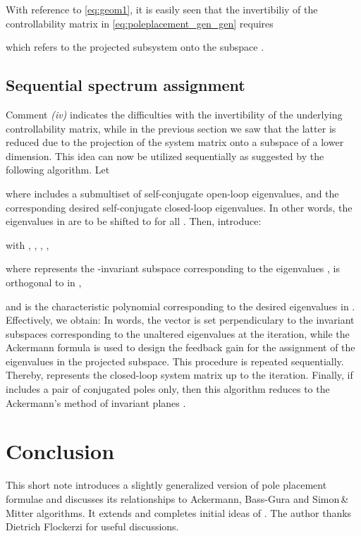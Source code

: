 \documentclass[conference]{IEEEtran}
\begin{document}
With reference to \eqref{eq:geom1},  it is easily seen that the invertibiliy of the controllability matrix  in \eqref{eq:poleplacement_gen_gen} requires

which refers to the projected subsystem  onto the subspace  \cite{Saad86}.

\subsection{Sequential spectrum assignment}
\label{Sequential spectrum assignment}
Comment \emph{(iv)} indicates the difficulties with the invertibility
of the underlying controllability matrix, while in the previous
section we saw that the latter is reduced due to the projection of the
system matrix onto a subspace of a lower dimension. This idea can now be utilized sequentially as suggested by the
following algorithm. Let

where  includes a submultiset of self-conjugate open-loop
eigenvalues, and  the corresponding desired self-conjugate
closed-loop eigenvalues. In other words, the eigenvalues in 
are to be shifted to  for all . Then, introduce:

with , , , ,

where  represents the -invariant subspace corresponding to the eigenvalues ,  is orthogonal to  in ,

and  is the characteristic polynomial corresponding to the desired eigenvalues in .
Effectively, we obtain: 
In words, the vector  is set perpendiculary to the invariant
subspaces  corresponding to the unaltered eigenvalues at
the  iteration, while the Ackermann formula is used to
design the feedback gain  for the assignment of the eigenvalues
 in the projected subspace. This procedure is repeated
sequentially. Thereby,  represents the closed-loop system
matrix up to the  iteration. Finally, if
 includes a pair of conjugated poles only, then this algorithm
reduces to the Ackermann's method of invariant planes \cite{ackermann93}.

\vspace{-5pt}
\section{Conclusion}
This short note introduces a slightly
generalized version of pole placement formulae and discusses its
relationships to Ackermann, Bass-Gura and Simon\,\&\,Mitter
algorithms. It extends and completes initial ideas of \cite{BajAJC}. The author thanks Dietrich Flockerzi for  useful discussions.

\vspace{-5pt}



\end{document}
